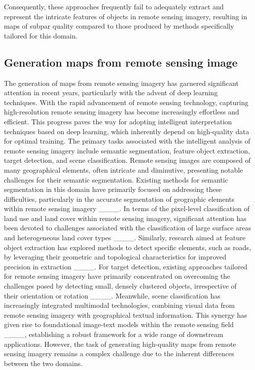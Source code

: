 Consequently, these approaches frequently fail to adequately extract and represent the intricate features of objects in remote sensing imagery, resulting in maps of subpar quality compared to those produced by methods specifically tailored for this domain.

\subsection{Generation maps from remote sensing image}
The generation of maps from remote sensing imagery has garnered significant attention in recent years, particularly with the advent of deep learning techniques. With the rapid advancement of remote sensing technology, capturing high-resolution remote sensing imagery has become increasingly effortless and efficient. This progress paves the way for adopting intelligent interpretation techniques based on deep learning, which inherently depend on high-quality data for optimal training. The primary tasks associated with the intelligent analysis of remote sensing imagery include semantic segmentation, feature object extraction, target detection, and scene classification. Remote sensing images are composed of many geographical elements, often intricate and diminutive, presenting notable challenges for their semantic segmentation. Existing methods for semantic segmentation in this domain have primarily focused on addressing these difficulties, particularly in the accurate segmentation of geographic elements within remote sensing imagery ____. In terms of the pixel-level classification of land use and land cover within remote sensing imagery, significant attention has been devoted to challenges associated with the classification of large surface areas and heterogeneous land cover types ____. Similarly, research aimed at feature object extraction has explored methods to detect specific elements, such as roads, by leveraging their geometric and topological characteristics for improved precision in extraction ____. For target detection, existing approaches tailored for remote sensing imagery have primarily concentrated on overcoming the challenges posed by detecting small, densely clustered objects, irrespective of their orientation or rotation ____. Meanwhile, scene classification has increasingly integrated multimodal technologies, combining visual data from remote sensing imagery with geographical textual information. This synergy has given rise to foundational image-text models within the remote sensing field ____, establishing a robust framework for a wide range of downstream applications. However, the task of generating high-quality maps from remote sensing imagery remains a complex challenge due to the inherent differences between the two domains.

